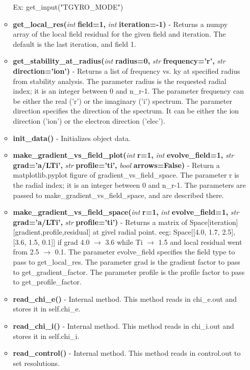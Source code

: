 \documentclass{article}
\begin{document}
\begin{itemize}
\begin{itemize}
Ex: get\_input("TGYRO\_MODE")
\item \textbf{get\_local\_res(}\emph{int}\textbf{ field=1,}\emph{ int}\textbf{ iteration=-1)} - Returns a numpy array of the local field residual for the given field and iteration.  The default is the last iteration, and field 1.
\item \textbf{get\_stability\_at\_radius(}\emph{int}\textbf{ radius=0,}\emph{ str}\textbf{ frequency='r',}\emph{ str}\textbf{ direction='ion')} - Returns a list of frequency vs. ky at specified radius from stability analysis.  The parameter radius is the requested radial index; it is an integer between 0 and n\_r-1.  The parameter frequency can be either the real ('r') or the imaginary ('i') spectrum.  The parameter direction specifies the direction of the spectrum.  It can be either the ion direction ('ion') or the electron direction ('elec').
\item \textbf{init\_data()} - Initializes object data.
\item \textbf{make\_gradient\_vs\_field\_plot(}\emph{int}\textbf{ r=1,}\emph{ int}\textbf{ evolve\_field=1,}\emph{ str}\textbf{ grad='a/LTi',}\emph{ str}\textbf{ profile='ti',}\emph{ bool}\textbf{ arrows=False)} - Return a matplotlib.pyplot figure of gradient\_vs\_field\_space.  The parameter r is the radial index; it is an integer between 0 and n\_r-1.  The parameters are passed to make\_gradient\_vs\_field\_space, and are described there.
\item \textbf{make\_gradient\_vs\_field\_space(}\emph{int}\textbf{ r=1,}\emph{ int}\textbf{ evolve\_field=1,}\emph{ str}\textbf{ grad='a/LTi',}\emph{ str}\textbf{ profile='ti')} - Returns a matrix of Space[iteration][gradient,profile,residual] at givel radial point.  eeg: Space[[4.0, 1.7, 2.5], [3.6, 1.5, 0.1]] if grad 4.0 $\rightarrow$ 3.6 while Ti $\rightarrow$ 1.5 and local residual went from 2.5 $\rightarrow$ 0.1.  The parameter evolve\_field specifies the field type to pass to get\_local\_res.  The parameter grad is the gradient factor to pass to get\_gradient\_factor.  The parameter profile is the profile factor to pass to get\_profile\_factor.
\item \textbf{read\_chi\_e()} - Internal method.  This method reads in chi\_e.out and stores it in self.chi\_e.
\item \textbf{read\_chi\_i()} - Internal method.  This method reads in chi\_i.out and stores it in self.chi\_i.
\item \textbf{read\_control()} - Internal method.  This method reads in control.out to set resolutions.

\end{itemize}
\end{itemize}
\end{document}
